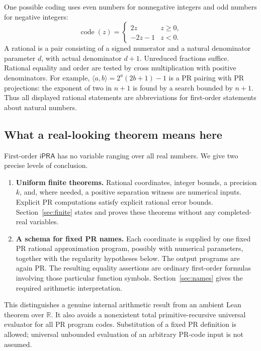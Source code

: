 \documentclass[11pt,a4paper]{article}
\theoremstyle{definition}
\newcommand{\ipra}{\mathsf{iPRA}}
\numberwithin{equation}{section}
\begin{document}
One possible coding uses even numbers for nonnegative integers and odd
numbers for negative integers:
\[
 \operatorname{code}(z)=
 \begin{cases}2z&z\ge0,\\-2z-1&z<0.\end{cases}
\]
A rational is a pair consisting of a signed numerator and a natural
denominator parameter \(d\), with actual denominator \(d+1\).
Unreduced fractions suffice. Rational equality and order are tested by
cross multiplication with positive denominators. For example,
\(\langle a,b\rangle=2^a(2b+1)-1\) is a PR pairing with PR projections:
the exponent of two in \(n+1\) is found by a search bounded by \(n+1\).
Thus all displayed rational statements are abbreviations for
first-order statements about natural numbers.

\subsection{What a real-looking theorem means here}

First-order \(\ipra\) has no variable ranging over all real numbers.
We give two precise levels of conclusion.

\begin{enumerate}
\item \textbf{Uniform finite theorems.} Rational coordinates, integer
bounds, a precision \(k\), and, where needed, a positive separation
witness are numerical inputs. Explicit PR computations satisfy explicit
rational error bounds. Section~\ref{sec:finite} states and proves these
theorems without any completed-real variables.
\item \textbf{A schema for fixed PR names.} Each coordinate is supplied
by one fixed PR rational approximation program, possibly with numerical
parameters, together with the regularity hypotheses below. The output
programs are again PR. The resulting equality assertions are ordinary
first-order formulas involving those particular function symbols.
Section~\ref{sec:names} gives the required arithmetic interpretation.
\end{enumerate}

This distinguishes a genuine internal arithmetic result from an ambient
Lean theorem over \(\mathbb R\). It also avoids a nonexistent total
primitive-recursive universal evaluator for all PR program codes.
Substitution of a fixed PR definition is allowed; universal unbounded
evaluation of an arbitrary PR-code input is not assumed.
\end{document}
